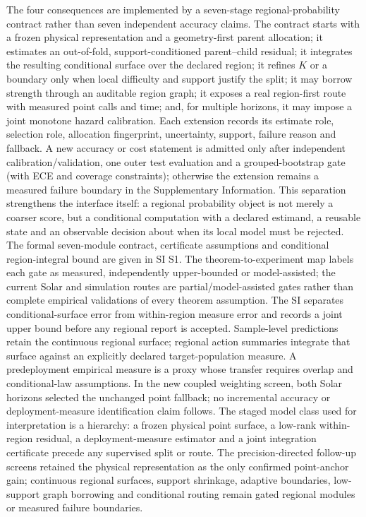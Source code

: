 \documentclass[10pt]{article}
\begin{document}
The four consequences are implemented by a seven-stage regional-probability contract rather than seven independent accuracy claims. The contract starts with a frozen physical representation and a geometry-first parent allocation; it estimates an out-of-fold, support-conditioned parent--child residual; it integrates the resulting conditional surface over the declared region; it refines $K$ or a boundary only when local difficulty and support justify the split; it may borrow strength through an auditable region graph; it exposes a real region-first route with measured point calls and time; and, for multiple horizons, it may impose a joint monotone hazard calibration. Each extension records its estimate role, selection role, allocation fingerprint, uncertainty, support, failure reason and fallback. A new accuracy or cost statement is admitted only after independent calibration/validation, one outer test evaluation and a grouped-bootstrap gate (with ECE and coverage constraints); otherwise the extension remains a measured failure boundary in the Supplementary Information. This separation strengthens the interface itself: a regional probability object is not merely a coarser score, but a conditional computation with a declared estimand, a reusable state and an observable decision about when its local model must be rejected. The formal seven-module contract, certificate assumptions and conditional region-integral bound are given in SI S1. The theorem-to-experiment map labels each gate as measured, independently upper-bounded or model-assisted; the current Solar and simulation routes are partial/model-assisted gates rather than complete empirical validations of every theorem assumption. The SI separates conditional-surface error from within-region measure error and records a joint upper bound before any regional report is accepted. Sample-level predictions retain the continuous regional surface; regional action summaries integrate that surface against an explicitly declared target-population measure. A predeployment empirical measure is a proxy whose transfer requires overlap and conditional-law assumptions. In the new coupled weighting screen, both Solar horizons selected the unchanged point fallback; no incremental accuracy or deployment-measure identification claim follows. The staged model class used for interpretation is a hierarchy: a frozen physical point surface, a low-rank within-region residual, a deployment-measure estimator and a joint integration certificate precede any supervised split or route. The precision-directed follow-up screens retained the physical representation as the only confirmed point-anchor gain; continuous regional surfaces, support shrinkage, adaptive boundaries, low-support graph borrowing and conditional routing remain gated regional modules or measured failure boundaries.
\end{document}
